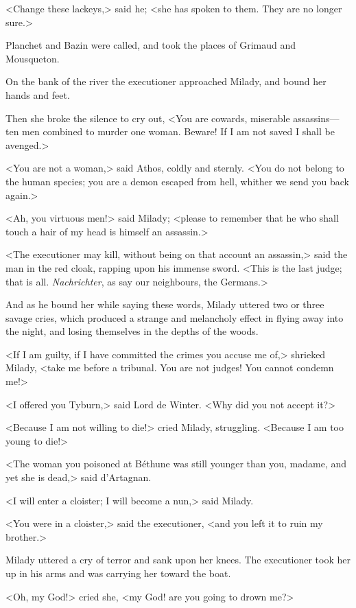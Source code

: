 <Change these lackeys,> said he; <she has spoken to them. They are no longer sure.> 

Planchet and Bazin were called, and took the places of Grimaud and Mousqueton. 

On the bank of the river the executioner approached Milady, and bound her hands and feet. 

Then she broke the silence to cry out, <You are cowards, miserable assassins---ten men combined to murder one woman. Beware! If I am not saved I shall be avenged.> 

<You are not a woman,> said Athos, coldly and sternly. <You do not belong to the human species; you are a demon escaped from hell, whither we send you back again.> 

<Ah, you virtuous men!> said Milady; <please to remember that he who shall touch a hair of my head is himself an assassin.> 

<The executioner may kill, without being on that account an assassin,> said the man in the red cloak, rapping upon his immense sword. <This is the last judge; that is all. \textit{Nachrichter}, as say our neighbours, the Germans.> 

And as he bound her while saying these words, Milady uttered two or three savage cries, which produced a strange and melancholy effect in flying away into the night, and losing themselves in the depths of the woods. 

<If I am guilty, if I have committed the crimes you accuse me of,> shrieked Milady, <take me before a tribunal. You are not judges! You cannot condemn me!> 

<I offered you Tyburn,> said Lord de Winter. <Why did you not accept it?> 

<Because I am not willing to die!> cried Milady, struggling. <Because I am too young to die!> 

<The woman you poisoned at Béthune was still younger than you, madame, and yet she is dead,> said d'Artagnan. 

<I will enter a cloister; I will become a nun,> said Milady. 

<You were in a cloister,> said the executioner, <and you left it to ruin my brother.> 

Milady uttered a cry of terror and sank upon her knees. The executioner took her up in his arms and was carrying her toward the boat. 

<Oh, my God!> cried she, <my God! are you going to drown me?> 

